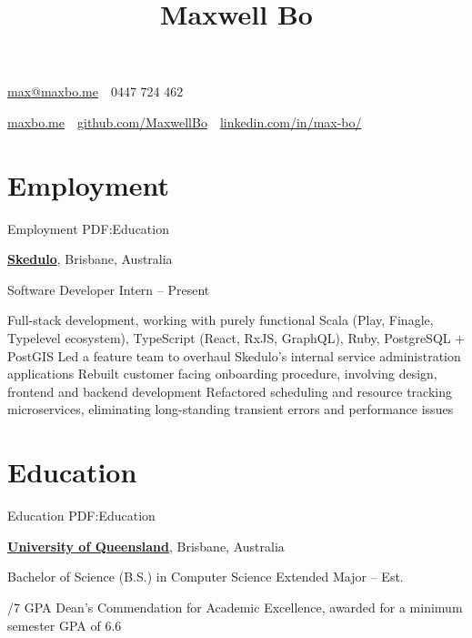\documentclass[a4paper,10pt,oneside]{article}
\begin{document}

\title{Maxwell Bo}

\begin{subtitle}
\par \href{mailto:max@maxbo.me}{max@maxbo.me} \,\BulletSymbol\, 0447 724 462

\par \href{http://maxbo.me/}{maxbo.me} 
\,\BulletSymbol\, 
\href{https://github.com/MaxwellBo}{github.com/MaxwellBo}
\,\BulletSymbol\, 
\href{https://www.linkedin.com/in/max-bo/}{linkedin.com/in/max-bo/}

\end{subtitle}

\begin{body}


\section
{Employment}
{Employment}
{PDF:Education}

\href{https://skedulo.com/}{\textbf{Skedulo}}, Brisbane, Australia
\par Software Developer Intern\hfill {} -- Present 
\begin{detail}
	\BulletItem Full-stack development, working with purely functional Scala (Play, Finagle, Typelevel ecosystem),\newline
	TypeScript (React, RxJS, GraphQL), Ruby, PostgreSQL + PostGIS
	\BulletItem Led a feature team to overhaul Skedulo's internal service administration applications
	\BulletItem Rebuilt customer facing onboarding procedure, involving design, frontend and backend development
	\BulletItem Refactored scheduling and resource tracking microservices, eliminating long-standing transient errors and performance issues
\end{detail}


\section
{Education}
{Education}
{PDF:Education}

\href{https://www.uq.edu.au/}{\textbf{University of Queensland}}, Brisbane, Australia
\par Bachelor of Science (B.S.) in Computer Science Extended Major\hfill {} -- Est. 
\begin{detail}
/7 GPA
\BulletItem Dean's Commendation for Academic Excellence, awarded for a minimum semester GPA of 6.6 \hfill {}
\end{detail}


\end{body}
\end{document}
